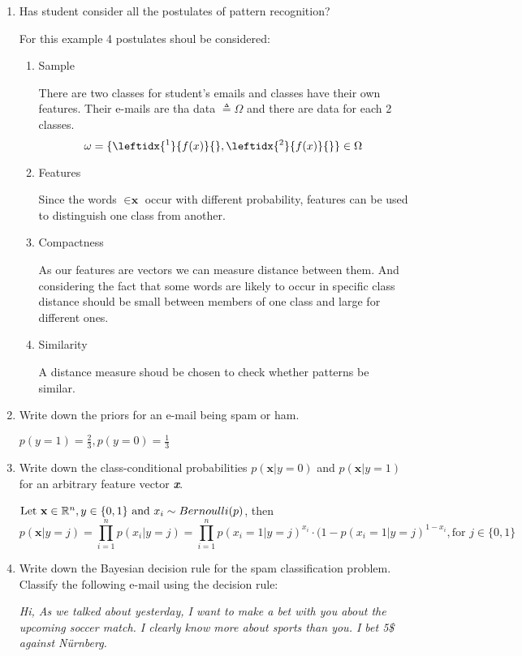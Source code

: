 \documentclass{homework}
\begin{document}
\begin{enumerate}[label=(\alph*)]
\item Has student consider all the postulates of pattern recognition?

	For this example 4 postulates shoul be considered:
	\begin{enumerate}[label=\arabic*]
	\item Sample

	There are two classes for student's emails and classes have their own features. Their e-mails are tha data $\triangleq \Omega$ and there are data for each 2 classes.
	\[\omega = \{\leftidx{^1}{f(x)}{}, \leftidx{^2}{f(x)}{}\} \in \Omega \]
	\item Features

	Since the words $\in \textbf{x}$ occur with different probability, features can be used to distinguish one class from another.
	\item Compactness

	As our features are vectors we can measure distance between them. And considering the fact that some words are likely to occur in specific class distance should be small between members of one class and large for different ones.
	\item Similarity
	
	A distance measure shoud be chosen to check whether patterns be similar. 
	\end{enumerate}
\item Write down the priors for an e-mail being spam or ham.

$p(y=1) = \frac{2}{3}, p(y=0) = \frac{1}{3}$
\item Write down the class-conditional probabilities $p(\textbf{x}|y=0)$ and $p(\textbf{x}|y=1)$ for an arbitrary feature vector \textbf{\emph{x}}.

 $\text{Let } \textbf{x} \in \mathbb R^n, y \in \{0, 1\} \text{ and } x_i \sim Bernoulli(p)$, then
\[p(\textbf{x}|y = j) = \prod_{i=1}^n p(x_i|y=j) = \prod_{i=1}^n p(x_i = 1|y=j)^{x_i}\cdot (1-p(x_i = 1|y=j)^{1 - x_i}, \text{for } j \in \{0, 1\}\]

\item Write down the Bayesian decision rule for the spam classification problem. Classify the following e-mail using the decision rule:

\emph{Hi, As we talked about yesterday, I want to make a bet with you about the upcoming soccer match. I clearly know more about sports than you. I bet 5\$ against N{\"u}rnberg.}


\end{enumerate}
\end{document}
